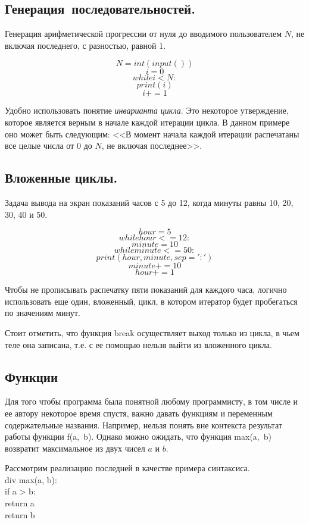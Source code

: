 \documentclass[a4paper, fleqn]{article}
\begin{document}
	
	\subsection*{Генерация~последовательностей.}
	
	
	Генерация арифметической прогрессии от нуля до вводимого пользователем $N$, не включая последнего, с разностью, равной $1$. 
	
	\[N = int(input())\]
	\[i=0\]
	\[while i<N:\]
	\[print(i)\]
	\[i+=1\]
	
	Удобно использовать понятие \emph{инварианта цикла}. Это некоторое утверждение, которое является верным в начале каждой итерации цикла. В данном примере оно может быть следующим: <<В момент начала каждой итерации распечатаны все целые числа от $0$ до $N$, не включая последнее>>. 
	
	\subsection*{Вложенные циклы.}
	
	Задача вывода на экран показаний часов с 5 до 12, когда минуты равны 10, 20, 30, 40 и 50.
	
	\[hour = 5\]
	\[while hour <= 12:\]
	\[minute = 10\]
	\[while minute <= 50:\]
	\[print(hour, minute, sep=':')\]
	\[minute += 10\]
	\[hour += 1\]
	
	Чтобы не прописывать распечатку пяти показаний для каждого часа, логично использовать еще один, вложенный, цикл, в котором итератор будет пробегаться по значениям минут.
	
	Стоит отметить, что функция break осуществляет выход только из цикла, в чьем теле она записана, т.е. с ее помощью нельзя выйти из вложенного цикла.
	
	
	\subsection*{Функции}
	
	Для того чтобы программа была понятной любому программисту, в том числе и ее автору некоторое время спустя, важно давать функциям и переменным содержательные названия. Например, нельзя понять вне контекста результат работы функции f(a,~b). Однако можно ожидать, что функция max(a,~b) возвратит максимальное из двух чисел $a$ и $b$.
	
	Рассмотрим реализацию последней в качестве примера синтаксиса.\\
	div max(a, b):\\
		if a > b:\\
			return a\\
		return b\\
	
\end{document}

